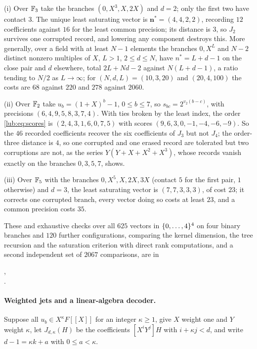 \begin{example}\label{lub:ex:unequal}
(i) Over $\mathbb{F}_3$ take the branches $(0,X^3,X,2X)$ and $d=2$; only the first two have contact $3$. The
unique least saturating vector is $\mathbf n^*=(4,4,2,2)$, recording $12$ coefficients against $16$ for
the least common precision; its distance is $3$, so $J_2$ survives one corrupted record, and lowering
any component destroys this. More generally, over a field with at least $N-1$ elements the branches
$0,X^L$ and $N-2$ distinct nonzero multiples of $X$, $L>1$, $2\le d\le N$, have $n^*=L+d-1$ on the close
pair and $d$ elsewhere, total $2L+Nd-2$ against $N(L+d-1)$, a ratio tending to $N/2$ as $L\to\infty$; for
$(N,d,L)=(10,3,20)$ and $(20,4,100)$ the costs are $68$ against $220$ and $278$ against $2060$.

(ii) Over $\mathbb{F}_2$ take $u_b=(1+X)^b-1$, $0\le b\le7$, so $s_{bc}=2^{v_2(b-c)}$, with precisions
$(6,4,9,5,8,3,7,4)$. With ties broken by the least index, the order \eqref{lub:eq:scores} is
$(2,4,3,1,6,0,7,5)$ with scores $(9,6,3,0,-1,-4,-6,-9)$. So the $46$ recorded coefficients recover the
six coefficients of $J_3$ but not $J_4$; the order-three distance is $4$, so one corrupted and one
erased record are tolerated but two corruptions are not, as the series $Y(Y+X+X^2+X^3)$, whose records
vanish exactly on the branches $0,3,5,7$, shows.

(iii) Over $\mathbb{F}_5$ with the branches $0,X^5,X,2X,3X$ (contact $5$ for the first pair, $1$ otherwise) and
$d=3$, the least saturating vector is $(7,7,3,3,3)$, of cost $23$; it corrects one corrupted branch, every
vector doing so costs at least $23$, and a common precision costs $35$.

These and exhaustive checks over all $625$ vectors in $\{0,\dots,4\}^4$ on four binary branches and
$120$ further configurations, comparing the kernel dimension, the tree recursion and the saturation
criterion with direct rank computations, and a second independent set of $2067$ comparisons, are in
\begin{center}
,\\
.
\end{center}
\end{example}

\paragraph{Weighted jets and a linear-algebra decoder.}
Suppose all $u_b\in X^\kappa F[[X]]$ for an integer $\kappa\ge1$, give $X$ weight one and $Y$ weight
$\kappa$, let $J_{d,\kappa}(H)$ be the coefficients $[X^iY^j]H$ with $i+\kappa j<d$, and write
$d-1=\kappa k+a$ with $0\le a<\kappa$.

